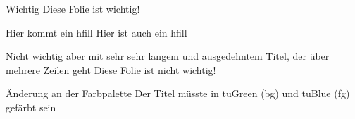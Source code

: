 \documentclass[fleqn,11pt,aspectratio=169]{beamer}
\begin{document}
\begin{frame}[highlight]{Wichtig}
Diese Folie ist wichtig!
\end{frame}

\begin{frame}{Hier kommt ein \hfill hfill}
Hier ist auch ein \hfill hfill
\end{frame}

\begin{frame}{Nicht wichtig aber mit sehr sehr langem und ausgedehntem Titel, der über mehrere Zeilen geht}
Diese Folie ist nicht wichtig!
\end{frame}

{
\begin{frame}{Änderung an der Farbpalette}
Der Titel müsste in tuGreen (bg) und tuBlue (fg) gefärbt sein
\end{frame}
}
\end{document}
